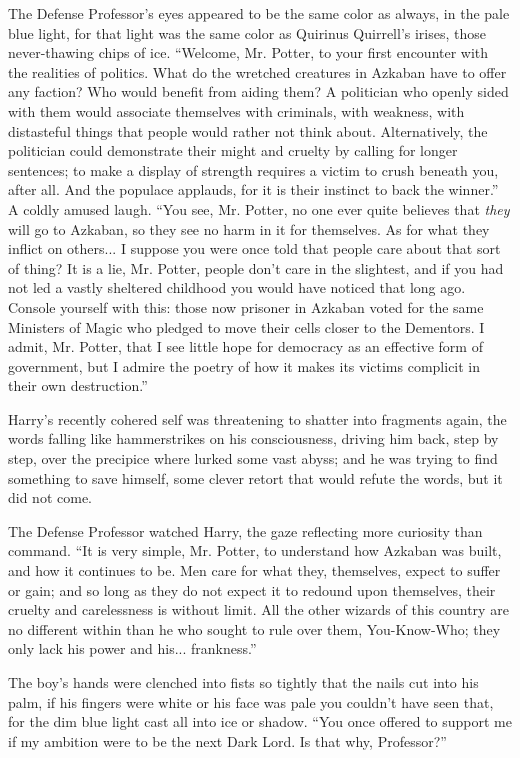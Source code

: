 The Defense Professor's eyes appeared to be the same color as always, in the pale blue light, for that light was the same color as Quirinus Quirrell's irises, those never-thawing chips of ice. ``Welcome, Mr. Potter, to your first encounter with the realities of politics. What do the wretched creatures in Azkaban have to offer any faction? Who would benefit from aiding them? A politician who openly sided with them would associate themselves with criminals, with weakness, with distasteful things that people would rather not think about. Alternatively, the politician could demonstrate their might and cruelty by calling for longer sentences; to make a display of strength requires a victim to crush beneath you, after all. And the populace applauds, for it is their instinct to back the winner.'' A coldly amused laugh. ``You see, Mr. Potter, no one ever quite believes that \emph{they} will go to Azkaban, so they see no harm in it for themselves. As for what they inflict on others... I suppose you were once told that people care about that sort of thing? It is a lie, Mr. Potter, people don't care in the slightest, and if you had not led a vastly sheltered childhood you would have noticed that long ago. Console yourself with this: those now prisoner in Azkaban voted for the same Ministers of Magic who pledged to move their cells closer to the Dementors. I admit, Mr. Potter, that I see little hope for democracy as an effective form of government, but I admire the poetry of how it makes its victims complicit in their own destruction.''

Harry's recently cohered self was threatening to shatter into fragments again, the words falling like hammerstrikes on his consciousness, driving him back, step by step, over the precipice where lurked some vast abyss; and he was trying to find something to save himself, some clever retort that would refute the words, but it did not come.

The Defense Professor watched Harry, the gaze reflecting more curiosity than command. ``It is very simple, Mr. Potter, to understand how Azkaban was built, and how it continues to be. Men care for what they, themselves, expect to suffer or gain; and so long as they do not expect it to redound upon themselves, their cruelty and carelessness is without limit. All the other wizards of this country are no different within than he who sought to rule over them, You-Know-Who; they only lack his power and his... frankness.''

The boy's hands were clenched into fists so tightly that the nails cut into his palm, if his fingers were white or his face was pale you couldn't have seen that, for the dim blue light cast all into ice or shadow. ``You once offered to support me if my ambition were to be the next Dark Lord. Is that why, Professor?''

